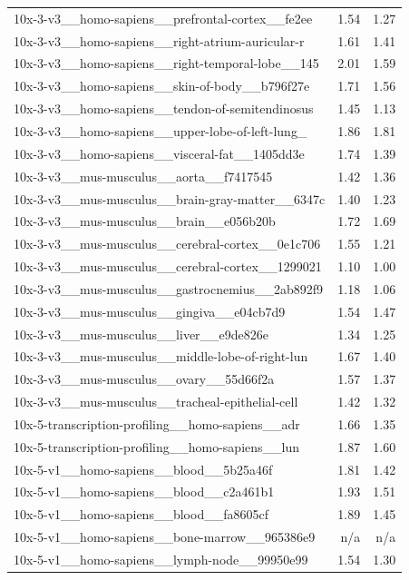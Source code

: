 \begin{table}[H]
{\begin{tabular}{lrr}
10x-3-v3\_\_homo-sapiens\_\_prefrontal-cortex\_\_fe2ee & 1.54 & 1.27 \\
10x-3-v3\_\_homo-sapiens\_\_right-atrium-auricular-r & 1.61 & 1.41 \\
10x-3-v3\_\_homo-sapiens\_\_right-temporal-lobe\_\_145 & 2.01 & 1.59 \\
10x-3-v3\_\_homo-sapiens\_\_skin-of-body\_\_b796f27e & 1.71 & 1.56 \\
10x-3-v3\_\_homo-sapiens\_\_tendon-of-semitendinosus & 1.45 & 1.13 \\
10x-3-v3\_\_homo-sapiens\_\_upper-lobe-of-left-lung\_ & 1.86 & 1.81 \\
10x-3-v3\_\_homo-sapiens\_\_visceral-fat\_\_1405dd3e & 1.74 & 1.39 \\
10x-3-v3\_\_mus-musculus\_\_aorta\_\_f7417545 & 1.42 & 1.36 \\
10x-3-v3\_\_mus-musculus\_\_brain-gray-matter\_\_6347c & 1.40 & 1.23 \\
10x-3-v3\_\_mus-musculus\_\_brain\_\_e056b20b & 1.72 & 1.69 \\
10x-3-v3\_\_mus-musculus\_\_cerebral-cortex\_\_0e1c706 & 1.55 & 1.21 \\
10x-3-v3\_\_mus-musculus\_\_cerebral-cortex\_\_1299021 & 1.10 & 1.00 \\
10x-3-v3\_\_mus-musculus\_\_gastrocnemius\_\_2ab892f9 & 1.18 & 1.06 \\
10x-3-v3\_\_mus-musculus\_\_gingiva\_\_e04cb7d9 & 1.54 & 1.47 \\
10x-3-v3\_\_mus-musculus\_\_liver\_\_e9de826e & 1.34 & 1.25 \\
10x-3-v3\_\_mus-musculus\_\_middle-lobe-of-right-lun & 1.67 & 1.40 \\
10x-3-v3\_\_mus-musculus\_\_ovary\_\_55d66f2a & 1.57 & 1.37 \\
10x-3-v3\_\_mus-musculus\_\_tracheal-epithelial-cell & 1.42 & 1.32 \\
10x-5-transcription-profiling\_\_homo-sapiens\_\_adr & 1.66 & 1.35 \\
10x-5-transcription-profiling\_\_homo-sapiens\_\_lun & 1.87 & 1.60 \\
10x-5-v1\_\_homo-sapiens\_\_blood\_\_5b25a46f & 1.81 & 1.42 \\
10x-5-v1\_\_homo-sapiens\_\_blood\_\_c2a461b1 & 1.93 & 1.51 \\
10x-5-v1\_\_homo-sapiens\_\_blood\_\_fa8605cf & 1.89 & 1.45 \\
10x-5-v1\_\_homo-sapiens\_\_bone-marrow\_\_965386e9 & n/a & n/a \\
10x-5-v1\_\_homo-sapiens\_\_lymph-node\_\_99950e99 & 1.54 & 1.30 \\

\end{tabular}}
\end{table}
